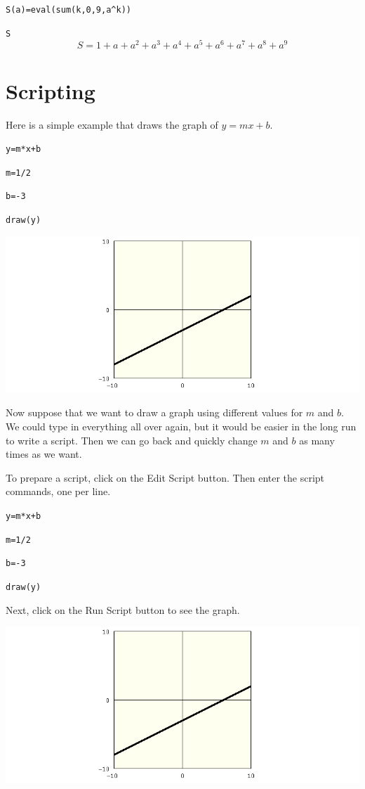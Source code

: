 \documentclass[12pt,openany]{report}
\begin{document}
\verb$S(a)=eval(sum(k,0,9,a^k))$

\verb$S$
$$S=1+a+a^2+a^3+a^4+a^5+a^6+a^7+a^8+a^9$$

\newpage

\chapter{Scripting}

\noindent
Here is a simple example that draws the graph of $y=mx+b$.

\medskip
{\tt y=m*x+b}

{\tt m=1/2}

{\tt b=-3}

{\tt draw(y)}

\medskip
\noindent
\includegraphics[scale=0.5]{1.png}

\newpage

\noindent
Now suppose that we want to draw a graph
using different values for $m$ and $b$.
We could type in everything all over again, but it would be easier
in the long run to write a script.
Then we can go back and quickly change $m$ and $b$ as many times as we want.

\medskip
\noindent
To prepare a script, click on the Edit Script button.
Then enter the script commands, one per line.

\medskip
{\tt y=m*x+b}

{\tt m=1/2}

{\tt b=-3}

{\tt draw(y)}

\medskip
\noindent
Next, click on the Run Script button to see the graph.

\medskip
\noindent
\includegraphics[scale=0.5]{1.png}
\end{document}

